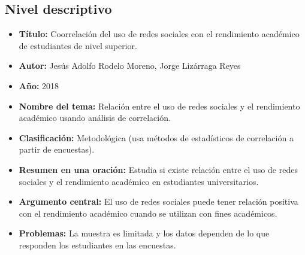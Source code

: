 \documentclass[12pt]{article}
\begin{document}
\subsection*{Nivel descriptivo}
\begin{itemize}
  \item \textbf{Título:} Coorrelación del uso de redes sociales con el rendimiento académico de estudiantes de nivel superior.
  \item \textbf{Autor:} Jesús Adolfo Rodelo Moreno, Jorge Lizárraga Reyes
  \item \textbf{Año:} 2018
  \item \textbf{Nombre del tema:} Relación entre el uso de redes sociales y el rendimiento académico usando análisis de correlación.
  \item \textbf{Clasificación:} Metodológica (usa métodos de estadísticos de correlación a partir de encuestas).
  \item \textbf{Resumen en una oración:} Estudia si existe relación entre el uso de redes sociales y el rendimiento académico en estudiantes universitarios.
  \item \textbf{Argumento central:} El uso de redes sociales puede tener relación positiva con el rendimiento académico cuando se utilizan con fines académicos.
  \item \textbf{Problemas:} La muestra es limitada y los datos dependen de lo que responden los estudiantes en las encuestas.
\end{itemize}
\end{document}

